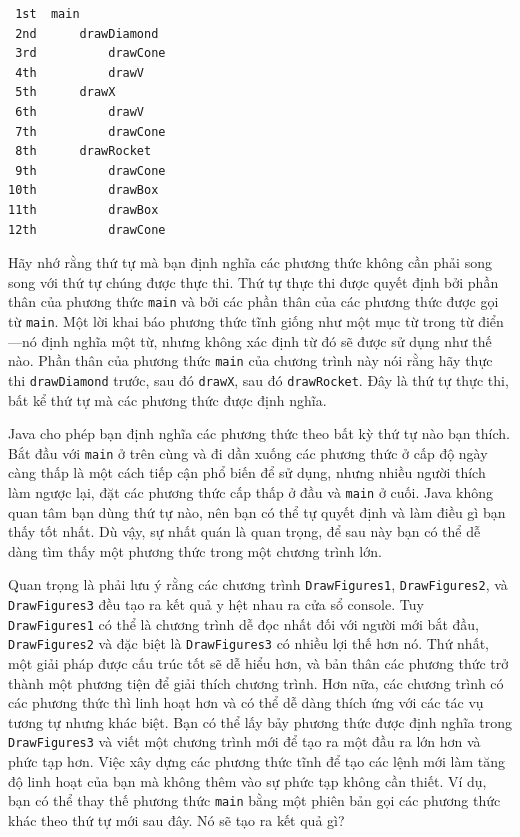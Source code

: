 \begin{verbatim}
 1st  main
 2nd      drawDiamond
 3rd          drawCone
 4th          drawV
 5th      drawX
 6th          drawV
 7th          drawCone
 8th      drawRocket
 9th          drawCone
10th          drawBox
11th          drawBox
12th          drawCone
\end{verbatim}

Hãy nhớ rằng thứ tự mà bạn định nghĩa các phương thức không cần phải
song song với thứ tự chúng được thực thi. Thứ tự thực thi được quyết
định bởi phần thân của phương thức \texttt{main} và bởi các phần thân
của các phương thức được gọi từ \texttt{main}. Một lời khai báo phương
thức tĩnh giống như một mục từ trong từ điển---nó định nghĩa một từ,
nhưng không xác định từ đó sẽ được sử dụng như thế nào. Phần thân của
phương thức \texttt{main} của chương trình này nói rằng hãy thực thi
\texttt{drawDiamond} trước, sau đó \texttt{drawX}, sau đó
\texttt{drawRocket}. Đây là thứ tự thực thi, bất kể thứ tự mà các phương
thức được định nghĩa.

Java cho phép bạn định nghĩa các phương thức theo bất kỳ thứ tự nào bạn
thích. Bắt đầu với \texttt{main} ở trên cùng và đi dần xuống các phương
thức ở cấp độ ngày càng thấp là một cách tiếp cận phổ biến để sử dụng,
nhưng nhiều người thích làm ngược lại, đặt các phương thức cấp thấp ở
đầu và \texttt{main} ở cuối. Java không quan tâm bạn dùng thứ tự nào,
nên bạn có thể tự quyết định và làm điều gì bạn thấy tốt nhất. Dù vậy,
sự nhất quán là quan trọng, để sau này bạn có thể dễ dàng tìm thấy một
phương thức trong một chương trình lớn.

Quan trọng là phải lưu ý rằng các chương trình \texttt{DrawFigures1},
\texttt{DrawFigures2}, và \texttt{DrawFigures3} đều tạo ra kết quả y hệt
nhau ra cửa sổ console. Tuy \texttt{DrawFigures1} có thể là chương trình
dễ đọc nhất đối với người mới bắt đầu, \texttt{DrawFigures2} và đặc biệt
là \texttt{DrawFigures3} có nhiều lợi thế hơn nó. Thứ nhất, một giải
pháp được cấu trúc tốt sẽ dễ hiểu hơn, và bản thân các phương thức trở
thành một phương tiện để giải thích chương trình. Hơn nữa, các chương
trình có các phương thức thì linh hoạt hơn và có thể dễ dàng thích ứng
với các tác vụ tương tự nhưng khác biệt. Bạn có thể lấy bảy phương thức
được định nghĩa trong \texttt{DrawFigures3} và viết một chương trình mới
để tạo ra một đầu ra lớn hơn và phức tạp hơn. Việc xây dựng các phương
thức tĩnh để tạo các lệnh mới làm tăng độ linh hoạt của bạn mà không
thêm vào sự phức tạp không cần thiết. Ví dụ, bạn có thể thay thế phương
thức \texttt{main} bằng một phiên bản gọi các phương thức khác theo thứ
tự mới sau đây. Nó sẽ tạo ra kết quả gì?

